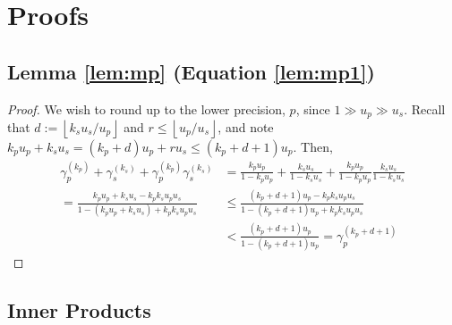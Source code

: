 \section{Proofs}\label{appendix:A}
\subsection{Lemma \ref{lem:mp} (Equation \ref{lem:mp1})}
\begin{proof}
	We wish to round up to the lower precision, $p$, since $1\gg u_p \gg u_s$.  
	Recall that $d := \left\lfloor k_s u_s  / u_p \right\rfloor$ and $r \leq \left\lfloor u_p  / u_s \right\rfloor$,
	and note
	$ k_pu_p+k_su_s = (k_p+d)u_p + r u_s \leq (k_p+d+1)u_p$. Then,
	\begin{align*}
	\gamma_{p}^{(k_p)}+\gamma_{s}^{(k_s)}+\gamma_{p}^{(k_p)}\gamma_{s}^{(k_s)} 
&= \frac{k_pu_p}{1-k_pu_p} + \frac{k_su_s}{1-k_su_s} + \frac{k_pu_p}{1-k_pu_p}\frac{k_su_s}{1-k_su_s} \\
	= \frac{k_pu_p+k_su_s-k_pk_su_pu_s}{1-(k_pu_p+k_su_s)+k_pk_su_pu_s} %
	&\leq \frac{(k_p+d+1)u_p-k_pk_su_pu_s}{1-(k_p+d+1)u_p+k_pk_su_pu_s} \\
	&< \frac{(k_p+d+1)u_p}{1-(k_p+d+1)u_p} = \gamma_{p}^{(k_p+d+1)}
	\end{align*}
\end{proof}

\subsection{Inner Products}
\label{appendix:IP}
